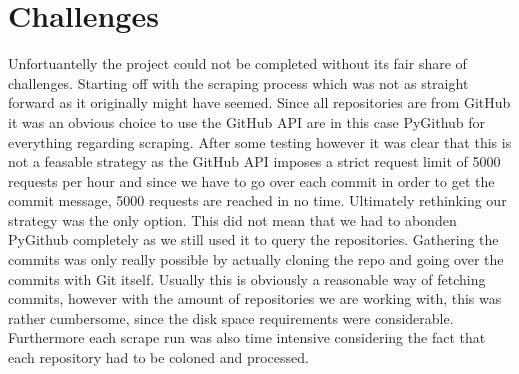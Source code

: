 \section{Challenges}
\label{sec:challenges}

Unfortuantelly the project could not be completed without its fair share of
challenges. Starting off with the scraping process which was not as straight
forward as it originally might have seemed. Since all repositories are from
GitHub it was an obvious choice to use the GitHub API are in this case PyGithub
for everything regarding scraping. After some testing however it was clear that
this is not a feasable strategy as the GitHub API imposes a strict request
limit of 5000 requests per hour and since we have to go over each commit in
order to get the commit message, 5000 requests are reached in no time.
Ultimately rethinking our strategy was the only option. This did not mean that
we had to abonden PyGithub completely as we still used it to query the
repositories. Gathering the commits was only really possible by actually
cloning the repo and going over the commits with Git itself. Usually this is
obviously a reasonable way of fetching commits, however with the amount of
repositories we are working with, this was rather cumbersome, since the disk
space requirements were considerable. Furthermore each scrape run was also time
intensive considering the fact that each repository had to be coloned and
processed.

